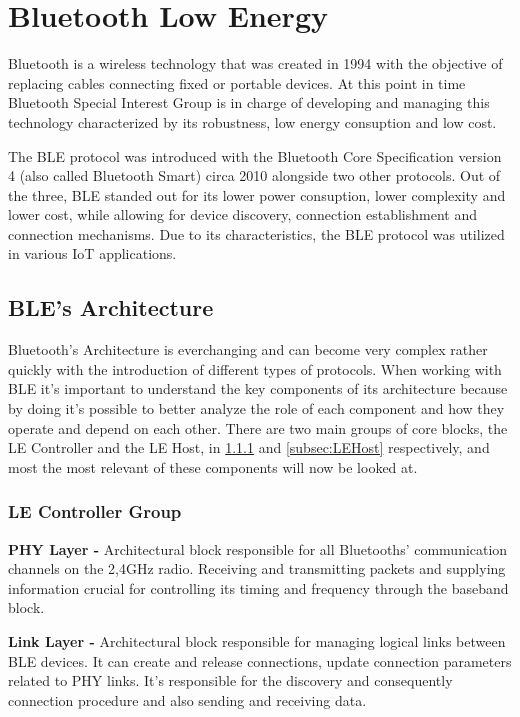 \section{Bluetooth Low Energy}
\label{sec:BLE}

Bluetooth is a wireless technology that was created in 1994 with the objective of replacing cables connecting fixed or portable devices. At this point in time Bluetooth Special Interest Group is in charge of developing and managing this technology characterized by its robustness, low energy consuption and low cost. 

The \ac{BLE} protocol was introduced with the Bluetooth Core Specification version 4 (also called Bluetooth Smart) circa 2010 alongside two other protocols.  Out of the three, \ac{BLE} standed out for its lower power consuption, lower complexity and lower cost, while allowing for  device discovery, connection establishment and connection mechanisms. Due to its characteristics, the \ac{BLE} protocol was utilized in various \ac{IoT} applications.  

\subsection{\ac{BLE}'s Architecture}
\label{subsec:BLEArchitecture}

Bluetooth's Architecture is everchanging and can become very complex rather quickly with the introduction of different types of protocols.
 When working with \ac{BLE} it's important to understand the key components of its architecture  because by doing it's possible to better analyze the role of each component and how they operate and depend on each other. There are two main groups of core blocks, the \ac{LE} Controller and the \ac{LE} Host, in \ref{subsec:LEController} and \ref{subsec:LEHost} respectively, and most the most relevant of these components will now be looked at.
 
 
\subsubsection{ \ac{LE} Controller Group}
\label{subsec:LEController}

\textbf{\ac{PHY} Layer -} Architectural block responsible for all Bluetooths' communication channels on the 2,4GHz radio. Receiving and transmitting packets and supplying information crucial for controlling its timing and frequency through the baseband block.


\textbf{Link Layer -} Architectural block responsible for managing logical links between \ac{BLE} devices. It can create and release connections, update connection parameters related to \ac{PHY} links. It's responsible for the discovery and consequently connection procedure and also sending and receiving data.



